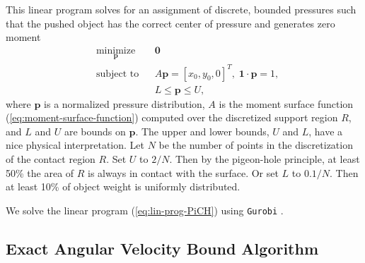 \documentclass[conference]{IEEEtran}
\begin{document}
This linear program solves for an assignment of discrete, bounded
pressures such that the pushed object has the correct center of
pressure and generates zero moment
\begin{equation}
  \begin{aligned}
    & \underset{\mathbf{p}}{\text{minimize}}
    & & \mathbf{0} \\
    & \text{subject to}
    & & A\mathbf{p} = [x_0,y_0,0]^T,\; \mathbf{1}\cdot\mathbf{p} = 1, \\
    & & & L \leq \mathbf{p} \leq U,
  \end{aligned} \label{eq:lin-prog-PiCH}
\end{equation}
where $\mathbf{p}$ is a normalized pressure distribution, $A$ is the
moment surface function (\ref{eq:moment-surface-function}) computed
over the discretized support region $R$, and $L$ and $U$ are bounds on
$\mathbf{p}$. The upper and lower bounds, $U$ and $L$, have a nice
physical interpretation. Let $N$ be the number of points in the
discretization of the contact region $R$. Set $U$ to $2/N$. Then by
the pigeon-hole principle, at least 50\% the area of $R$ is always in
contact with the surface.  Or set $L$ to $0.1/N$. Then at least 10\%
of object weight is uniformly distributed.

We solve the linear program (\ref{eq:lin-prog-PiCH}) using
\texttt{Gurobi} \cite{gurobi}.


\subsection{Exact Angular Velocity Bound
  Algorithm}\label{sec:exact-ang-vel-bound-alg}
\end{document}
